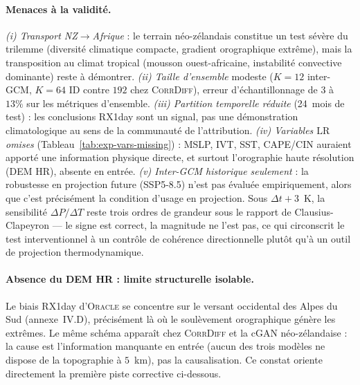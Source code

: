 \documentclass[14pt,a4paper,openany]{extreport}
\newcommand{\Oracle}{\textsc{Oracle}}
\newcommand{\CorrDiff}{\textsc{CorrDiff}}
\newcommand{\LR}{\ensuremath{\text{LR}}}
\begin{document}
\paragraph{Menaces à la validité.} \emph{(i) Transport NZ$\to$Afrique} : le terrain néo-zélandais constitue un test sévère du trilemme (diversité climatique compacte, gradient orographique extrême), mais la transposition au climat tropical (mousson ouest-africaine, instabilité convective dominante) reste à démontrer. \emph{(ii) Taille d'ensemble} modeste ($K=12$ inter-GCM, $K=64$ ID contre $192$ chez \CorrDiff{}), erreur d'échantillonnage de $3$ à $13\%$ sur les métriques d'ensemble. \emph{(iii) Partition temporelle réduite} (24~mois de test) : les conclusions RX1day sont un signal, pas une démonstration climatologique au sens de la communauté de l'attribution. \emph{(iv) Variables \LR{} omises} (Tableau~\ref{tab:exp-vars-missing}) : MSLP, IVT, SST, CAPE/CIN auraient apporté une information physique directe, et surtout l'orographie haute résolution (DEM HR), absente en entrée. \emph{(v) Inter-GCM historique seulement} : la robustesse en projection future (SSP5-8.5) n'est pas évaluée empiriquement, alors que c'est précisément la condition d'usage en projection. Sous $\Delta t+3$~K, la sensibilité $\Delta P/\Delta T$ reste trois ordres de grandeur sous le rapport de Clausius-Clapeyron --- le signe est correct, la magnitude ne l'est pas, ce qui circonscrit le test interventionnel à un contrôle de cohérence directionnelle plutôt qu'à un outil de projection thermodynamique.

\paragraph{Absence du DEM HR : limite structurelle isolable.} Le biais RX1day d'\Oracle{} se concentre sur le versant occidental des Alpes du Sud (annexe~IV.D), précisément là où le soulèvement orographique génère les extrêmes. Le même schéma apparaît chez \CorrDiff{} et la cGAN néo-zélandaise : la cause est l'information manquante en entrée (aucun des trois modèles ne dispose de la topographie à $5$~km), pas la causalisation. Ce constat oriente directement la première piste corrective ci-dessous.
\end{document}
